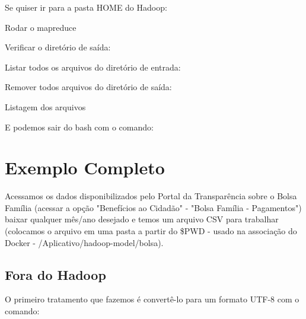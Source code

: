 \documentclass[a4paper,11pt]{article}
\begin{document}
Se quiser ir para a pasta HOME do Hadoop: \\

Rodar o mapreduce \\

Verificar o diretório de saída: \\

Listar todos os arquivos do diretório de entrada: \\

Remover todos arquivos do diretório de saída: \\

Listagem dos arquivos \\

E podemos sair do bash com o comando: \\

\section{Exemplo Completo}
Acessamos os dados disponibilizados pelo Portal da Transparência\cite{portaltransp} sobre o Bolsa Família (acessar a opção "Benefícios ao Cidadão" - "Bolsa Família - Pagamentos") baixar qualquer mês/ano desejado e temos um arquivo CSV para trabalhar (colocamos o arquivo em uma pasta a partir do \$PWD - usado na associação do Docker - /Aplicativo/hadoop-model/bolsa).

\subsection{Fora do Hadoop}
O primeiro tratamento que fazemos é convertê-lo para um formato UTF-8 com o comando: \\
\end{document}
